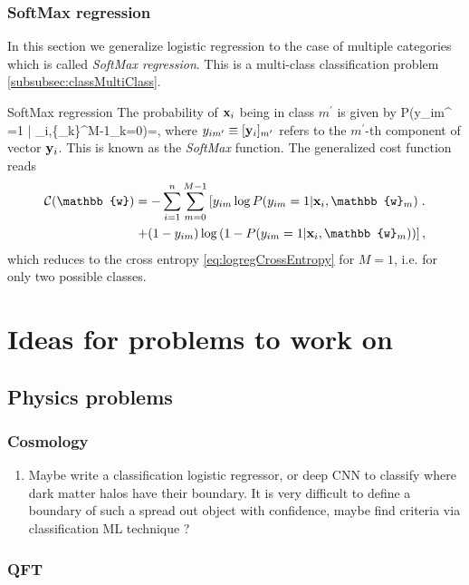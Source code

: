 \subsection{SoftMax regression}
In this section we generalize logistic regression to the case of multiple categories which is called \emph{SoftMax regression}. This is a multi-class classification problem \ref{subsubsec:classMultiClass}.
\begin{mybox}{SoftMax regression}
	The probability of $\mathbf{x}_i$ being in class $m^\prime$ is given by
	\be
	\label{eq:logregSoftMaxfct} 
	P(y_{im^\prime} =1 | \mx_i,\{_k\}^{M-1}_{k=0})=,
	\ee 
	where $y_{im^\prime} \equiv [\mathbf{y}_i]_{m^\prime}$ refers to the $m^\prime$-th component of vector $\mathbf{y}_i$. This is known as the \emph{SoftMax} function. The generalized cost function reads
	\begin{align}
	\label{eq:logregSoftMaxcostFct}
	\mC(\mathbb{w}) &= - \sum_{i=1}^n \sum_{m=0}^{M-1} \left[ y_{im} \log P(y_{im}=1|\mx_i, \mathbb{w}_m) \right.. \\
	&\left. + (1-y_{im }) \log\left(1-P(y_{im} =1 |\mx_i ,\mathbb{w}_m)\right)\right],
	\end{align} 
	which reduces to the cross entropy \ref{eq:logregCrossEntropy} for $M=1$, i.e. for only two possible classes.
\end{mybox}
























\chapter{Ideas for problems to work on}
\section{Physics problems}
\subsection{Cosmology}
\begin{enumerate}
	\item Maybe write a classification logistic regressor, or deep CNN to classify where dark matter halos have their boundary. It is very difficult to define a boundary of such a spread out object with confidence, maybe find criteria via classification ML technique ?
\end{enumerate}
\subsection{QFT}